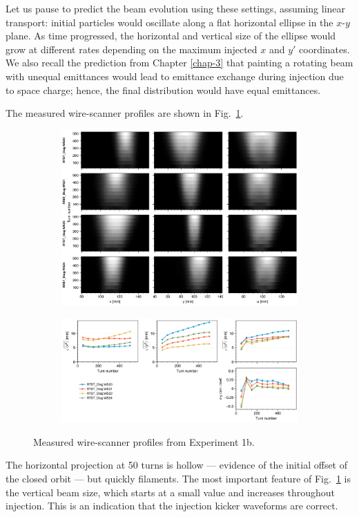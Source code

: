 Let us pause to predict the beam evolution using these settings, assuming linear transport: initial particles would oscillate along a flat horizontal ellipse in the $x$-$y$ plane. As time progressed, the horizontal and vertical size of the ellipse would grow at different rates depending on the maximum injected $x$ and $y'$ coordinates. We also recall the prediction from Chapter \ref{chap-3} that painting a rotating beam with unequal emittances would lead to emittance exchange during injection due to space charge; hence, the final distribution would have equal emittances.

The measured wire-scanner profiles are shown in Fig.~\ref{fig:exp1b_wsmeas}.
%
\begin{figure}[!p]
    \centering
    \begin{subfigure}{\textwidth}
        \includegraphics[width=\textwidth]{Images/chapter5/exp1b/waterfall.png}
    \end{subfigure}
    \vfill
    \vspace*{1.25cm}
    \vfill
    \begin{subfigure}{\textwidth}
        \includegraphics[width=\textwidth]{Images/chapter5/exp1b/rms.png}
    \end{subfigure}
    \caption{Measured wire-scanner profiles from Experiment 1b.}
    \label{fig:exp1b_wsmeas}
\end{figure}
%
The horizontal projection at 50 turns is hollow — evidence of the initial offset of the closed orbit — but quickly filaments. The most important feature of Fig.~\ref{fig:exp1b_wsmeas} is the vertical beam size, which starts at a small value and increases throughout injection. This is an indication that the injection kicker waveforms are correct.

